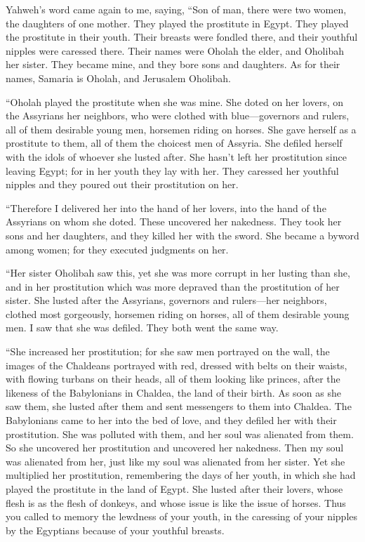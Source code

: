  Yahweh's word came again to me, saying,  ``Son
of man, there were two women, the daughters of one mother. 
They played the prostitute in Egypt. They played the prostitute in their
youth. Their breasts were fondled there, and their youthful nipples were
caressed there.  Their names were Oholah the elder, and
Oholibah her sister. They became mine, and they bore sons and daughters.
As for their names, Samaria is Oholah, and Jerusalem Oholibah.

 ``Oholah played the prostitute when she was mine. She doted
on her lovers, on the Assyrians her neighbors,  who were
clothed with blue---governors and rulers, all of them desirable young
men, horsemen riding on horses.  She gave herself as a
prostitute to them, all of them the choicest men of Assyria. She defiled
herself with the idols of whoever she lusted after.  She
hasn't left her prostitution since leaving Egypt; for in her youth they
lay with her. They caressed her youthful nipples and they poured out
their prostitution on her.

 ``Therefore I delivered her into the hand of her lovers,
into the hand of the Assyrians on whom she doted.  These
uncovered her nakedness. They took her sons and her daughters, and they
killed her with the sword. She became a byword among women; for they
executed judgments on her.

 ``Her sister Oholibah saw this, yet she was more corrupt
in her lusting than she, and in her prostitution which was more depraved
than the prostitution of her sister.  She lusted after the
Assyrians, governors and rulers---her neighbors, clothed most
gorgeously, horsemen riding on horses, all of them desirable young men.
 I saw that she was defiled. They both went the same way.

 ``She increased her prostitution; for she saw men
portrayed on the wall, the images of the Chaldeans portrayed with red,
 dressed with belts on their waists, with flowing turbans
on their heads, all of them looking like princes, after the likeness of
the Babylonians in Chaldea, the land of their birth.  As
soon as she saw them, she lusted after them and sent messengers to them
into Chaldea.  The Babylonians came to her into the bed of
love, and they defiled her with their prostitution. She was polluted
with them, and her soul was alienated from them.  So she
uncovered her prostitution and uncovered her nakedness. Then my soul was
alienated from her, just like my soul was alienated from her sister.
 Yet she multiplied her prostitution, remembering the days
of her youth, in which she had played the prostitute in the land of
Egypt.  She lusted after their lovers, whose flesh is as
the flesh of donkeys, and whose issue is like the issue of horses.
 Thus you called to memory the lewdness of your youth, in
the caressing of your nipples by the Egyptians because of your youthful
breasts.

